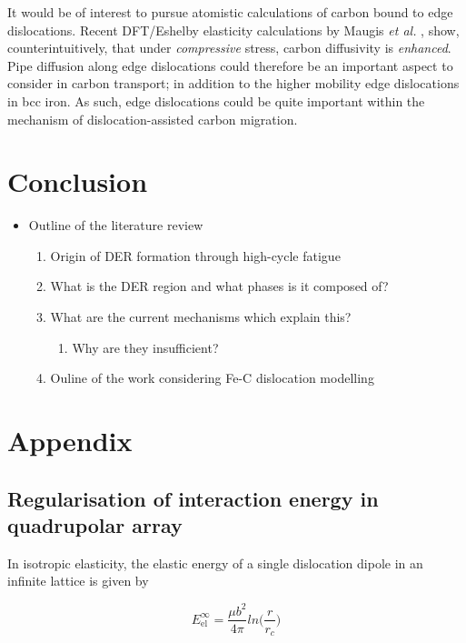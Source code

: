\documentclass[a4paper,11pt]{article}
\begin{document}
It would be of interest to pursue atomistic calculations of carbon bound to edge
dislocations. Recent DFT/Eshelby elasticity calculations by Maugis \emph{et al.} \cite{Maugis2020}, show,
counterintuitively, that under \emph{compressive} stress, carbon diffusivity is \emph{enhanced}. Pipe
diffusion along edge dislocations could therefore be an important aspect to consider in carbon transport; in
addition to the higher mobility edge dislocations in bcc iron. As such, edge dislocations could be quite
important within the mechanism of dislocation-assisted carbon migration.


\section{Conclusion}
\label{sec:orga09e61a}


\begin{itemize}
\item Outline of the literature review 
\begin{enumerate}
\item Origin of DER formation through high-cycle fatigue
\item What is the DER region and what phases is it composed of?
\item What are the current mechanisms which explain this?
\begin{enumerate}
\item Why are they insufficient?
\end{enumerate}
\item Ouline of the work considering Fe-C dislocation modelling
\end{enumerate}
\end{itemize}

\section{Appendix}
\label{sec:org969c811}

\subsection{Regularisation of interaction energy in quadrupolar array}
\label{sec:org2b11ae5}
\label{sec:Ainteractionenergy}


In isotropic elasticity, the elastic energy of a single dislocation dipole in an
infinite lattice is given by


\[ E_{\text{el}}^{\infty} = \frac{\mu b^2}{4\pi} ln \big( \frac{r}{r_{c}} \big)  \]
\end{document}
